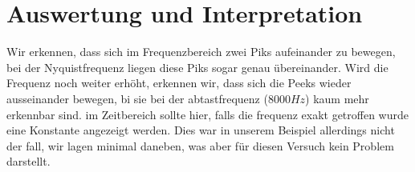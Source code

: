 \section{Auswertung und Interpretation}
\label{chap:V5_AUSWERTUNGUNDINTERPRETATION5}
Wir erkennen, dass sich im Frequenzbereich zwei Piks aufeinander zu bewegen, bei der Nyquistfrequenz liegen diese Piks sogar genau übereinander. Wird die Frequenz noch weiter erhöht, erkennen wir, dass sich die Peeks wieder ausseinander bewegen, bi sie bei der abtastfrequenz (8000$Hz$) kaum mehr erkennbar sind. im Zeitbereich sollte hier, falls die frequenz exakt getroffen wurde eine Konstante angezeigt werden. Dies war in unserem Beispiel allerdings nicht der fall, wir lagen minimal daneben, was aber für diesen Versuch kein Problem darstellt.